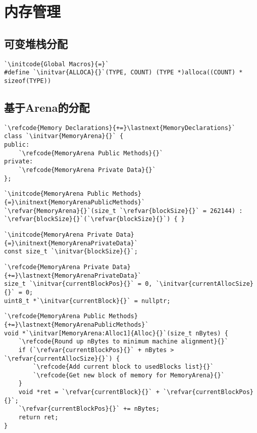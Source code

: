 \section{内存管理}\label{sec:内存管理}

\subsection{可变堆栈分配}\label{sub:可变堆栈分配}
\begin{lstlisting}
`\initcode{Global Macros}{=}`
#define `\initvar{ALLOCA}{}`(TYPE, COUNT) (TYPE *)alloca((COUNT) * sizeof(TYPE))
\end{lstlisting}

\subsection{基于Arena的分配}\label{sub:基于Arena的分配}
\begin{lstlisting}
`\refcode{Memory Declarations}{+=}\lastnext{MemoryDeclarations}`
class `\initvar{MemoryArena}{}` {
public:
    `\refcode{MemoryArena Public Methods}{}`
private:
    `\refcode{MemoryArena Private Data}{}`
};
\end{lstlisting}

\begin{lstlisting}
`\initcode{MemoryArena Public Methods}{=}\initnext{MemoryArenaPublicMethods}`
`\refvar{MemoryArena}{}`(size_t `\refvar{blockSize}{}` = 262144) : `\refvar{blockSize}{}`(`\refvar{blockSize}{}`) { }
\end{lstlisting}

\begin{lstlisting}
`\initcode{MemoryArena Private Data}{=}\initnext{MemoryArenaPrivateData}`
const size_t `\initvar{blockSize}{}`;
\end{lstlisting}

\begin{lstlisting}
`\refcode{MemoryArena Private Data}{+=}\lastnext{MemoryArenaPrivateData}`
size_t `\initvar{currentBlockPos}{}` = 0, `\initvar{currentAllocSize}{}` = 0;
uint8_t *`\initvar{currentBlock}{}` = nullptr;
\end{lstlisting}

\begin{lstlisting}
`\refcode{MemoryArena Public Methods}{+=}\lastnext{MemoryArenaPublicMethods}`
void *`\initvar[MemoryArena:Alloc1]{Alloc}{}`(size_t nBytes) {
    `\refcode{Round up nBytes to minimum machine alignment}{}`
    if (`\refvar{currentBlockPos}{}` + nBytes > `\refvar{currentAllocSize}{}`) {
        `\refcode{Add current block to usedBlocks list}{}`
        `\refcode{Get new block of memory for MemoryArena}{}`
    }
    void *ret = `\refvar{currentBlock}{}` + `\refvar{currentBlockPos}{}`;
    `\refvar{currentBlockPos}{}` += nBytes;
    return ret;
}
\end{lstlisting}

